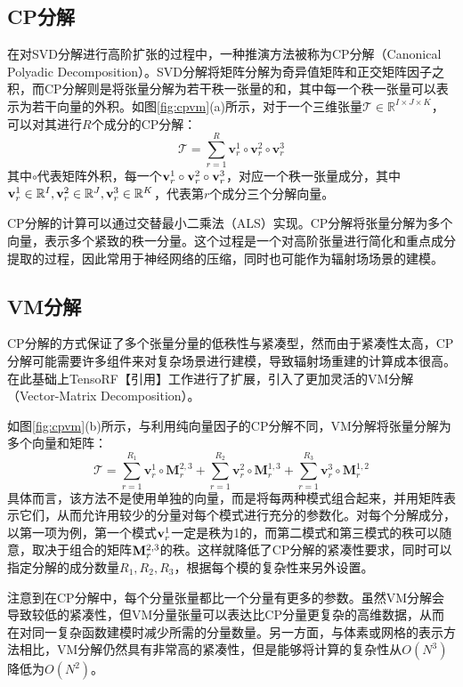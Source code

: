 \documentclass[10pt,twocolumn,letterpaper]{article}
\begin{document}
\subsection{CP分解}
\label{sec:cp}
在对SVD分解进行高阶扩张的过程中，一种推演方法被称为CP分解（Canonical Polyadic Decomposition）。SVD分解将矩阵分解为奇异值矩阵和正交矩阵因子之积，而CP分解则是将张量分解为若干秩一张量的和，其中每一个秩一张量可以表示为若干向量的外积。如图\ref{fig:cpvm}(a)所示，对于一个三维张量$\mathcal T\in\mathbb R^{I\times J\times K}$，可以对其进行$R$个成分的CP分解：
\begin{equation}
  \mathcal{T}=\sum_{r=1}^{R} \mathbf{v}_{r}^{1} \circ \mathbf{v}_{r}^{2} \circ \mathbf{v}_{r}^{3}
\end{equation}
\label{eq:3}
其中$\circ$代表矩阵外积，每一个$\bold v^1_r\circ\bold v^2_r\circ\bold v^3_r$，对应一个秩一张量成分，其中$\bold v^1_r\in\mathbb R^I,\bold v^2_r\in\mathbb R^J,\bold v^3_r\in\mathbb R^K$，代表第$r$个成分三个分解向量。

CP分解的计算可以通过交替最小二乘法（ALS）实现。CP分解将张量分解为多个向量，表示多个紧致的秩一分量。这个过程是一个对高阶张量进行简化和重点成分提取的过程，因此常用于神经网络的压缩，同时也可能作为辐射场场景的建模。

\subsection{VM分解}
\label{sec:vm}
CP分解的方式保证了多个张量分量的低秩性与紧凑型，然而由于紧凑性太高，CP分解可能需要许多组件来对复杂场景进行建模，导致辐射场重建的计算成本很高。在此基础上TensoRF【引用】工作进行了扩展，引入了更加灵活的VM分解（Vector-Matrix Decomposition）。

如图\ref{fig:cpvm}(b)所示，与利用纯向量因子的CP分解不同，VM分解将张量分解为多个向量和矩阵：
\begin{equation}
  \mathcal{T}=\sum_{r=1}^{R_{1}} \mathbf{v}_{r}^{1} \circ \mathbf{M}_{r}^{2,3}+\sum_{r=1}^{R_{2}} \mathbf{v}_{r}^{2} \circ \mathbf{M}_{r}^{1,3}+\sum_{r=1}^{R_{3}} \mathbf{v}_{r}^{3} \circ \mathbf{M}_{r}^{1,2}
\end{equation}
\label{eq:4}
具体而言，该方法不是使用单独的向量，而是将每两种模式组合起来，并用矩阵表示它们，从而允许用较少的分量对每个模式进行充分的参数化。对每个分解成分，以第一项为例，第一个模式$\bold v^1_r$一定是秩为1的，而第二模式和第三模式的秩可以随意，取决于组合的矩阵$\bold M^{2,3}_r$的秩。这样就降低了CP分解的紧凑性要求，同时可以指定分解的成分数量$R_1,R_2,R_3$，根据每个模的复杂性来另外设置。

注意到在CP分解中，每个分量张量都比一个分量有更多的参数。虽然VM分解会导致较低的紧凑性，但VM分量张量可以表达比CP分量更复杂的高维数据，从而在对同一复杂函数建模时减少所需的分量数量。另一方面，与体素或网格的表示方法相比，VM分解仍然具有非常高的紧凑性，但是能够将计算的复杂性从$O(N^3)$降低为$O(N^2)$。
\end{document}
